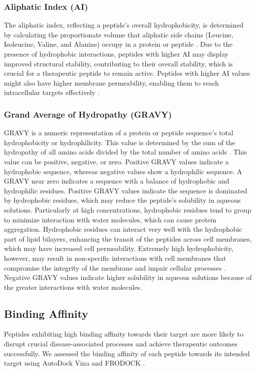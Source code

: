 \vspace{4pt} \noindent
\subsubsection{Aliphatic Index (AI)}
The aliphatic index, reflecting a peptide's overall hydrophobicity, is determined by calculating the proportionate volume that aliphatic side chains (Leucine, Isoleucine, Valine, and Alanine) occupy in a protein or peptide \cite{panda2012physicochemical}. Due to the presence of hydrophobic interactions, peptides with higher AI may display improved structural stability, contributing to their overall stability, which is crucial for a therapeutic peptide to remain active. Peptides with higher AI values might also have higher membrane permeability, enabling them to reach intracellular targets effectively \cite{panda2012physicochemical}.

\vspace{4pt} \noindent
\subsubsection{Grand Average of Hydropathy (GRAVY)}
GRAVY is a numeric representation of a protein or peptide sequence's total hydrophobicity or hydrophilicity. This value is determined by the sum of the hydropathy of all amino acids divided by the total number of amino acids \cite{kyte1982simple}. This value can be positive, negative, or zero. Positive GRAVY values indicate a hydrophobic sequence, whereas negative values show a hydrophilic sequence. A GRAVY near zero indicates a sequence with a balance of hydrophobic and hydrophilic residues. Positive GRAVY values indicate the sequence is dominated by hydrophobic residues, which may reduce the peptide's solubility in aqueous solutions. Particularly at high concentrations, hydrophobic residues tend to group to minimize interaction with water molecules, which can cause protein aggregation. Hydrophobic residues can interact very well with the hydrophobic part of lipid bilayers, enhancing the transit of the peptides across cell membranes, which may have increased cell permeability. Extremely high hydrophobicity, however, may result in non-specific interactions with cell membranes that compromise the integrity of the membrane and impair cellular processes \cite{kyte1982simple}. Negative GRAVY values indicate higher solubility in aqueous solutions because of the greater interactions with water molecules.

\subsection{Binding Affinity}
Peptides exhibiting high binding affinity towards their target are more likely to disrupt crucial disease-associated processes and achieve therapeutic outcomes successfully. We assessed the binding affinity of each peptide towards its intended target using AutoDock Vina \cite{trott2010autodock} and FRODOCK \cite{Aportela2016}.

